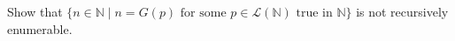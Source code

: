 Show that $\{n \in \mathbb{N} \mid n = G(p) \text{ for some } p \in \mathcal{L}(\mathbb{N}) \text{ true in } \mathbb{N}\}$ is not recursively enumerable.
